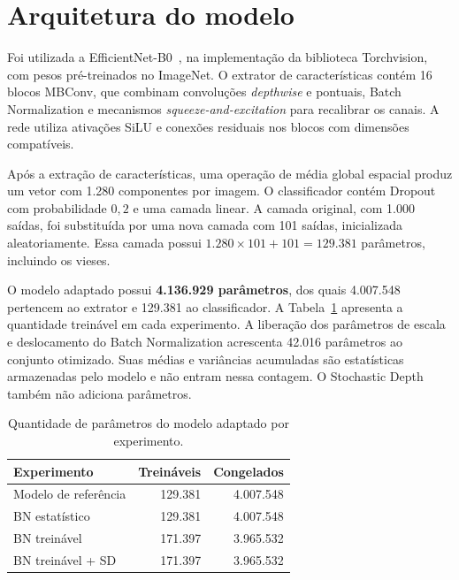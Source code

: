 \section{Arquitetura do modelo}
\label{sec:arquitetura}

Foi utilizada a EfficientNet-B0~\cite{tan2019efficientnet}, na implementação
da biblioteca Torchvision, com pesos pré-treinados no ImageNet. O extrator
de características contém 16 blocos MBConv, que combinam convoluções
\textit{depthwise} e pontuais, Batch Normalization e mecanismos
\textit{squeeze-and-excitation} para recalibrar os canais. A rede utiliza
ativações SiLU e conexões residuais nos blocos com dimensões compatíveis.

Após a extração de características, uma operação de média global espacial
produz um vetor com 1.280 componentes por imagem. O classificador contém
Dropout com probabilidade $0{,}2$ e uma camada linear. A camada original,
com 1.000 saídas, foi substituída por uma nova camada com 101 saídas,
inicializada aleatoriamente. Essa camada possui
$1.280 \times 101 + 101 = 129.381$ parâmetros, incluindo os vieses.

O modelo adaptado possui \textbf{4.136.929 parâmetros}, dos quais 4.007.548
pertencem ao extrator e 129.381 ao classificador. A
Tabela~\ref{tab:parametros} apresenta a quantidade treinável em cada
experimento. A liberação dos parâmetros de escala e deslocamento do Batch
Normalization acrescenta 42.016 parâmetros ao conjunto otimizado. Suas
médias e variâncias acumuladas são estatísticas armazenadas pelo modelo e
não entram nessa contagem. O Stochastic Depth também não adiciona parâmetros.

\begin{table}[ht]
  \centering
  \caption{Quantidade de parâmetros do modelo adaptado por experimento.}
  \label{tab:parametros}
  \begin{tabular}{lrr}
    \hline
    Experimento & Treináveis & Congelados \\
    \hline
    Modelo de referência & 129.381 & 4.007.548 \\
    BN estatístico & 129.381 & 4.007.548 \\
    BN treinável & 171.397 & 3.965.532 \\
    BN treinável + SD & 171.397 & 3.965.532 \\
    \hline
  \end{tabular}
\end{table}
